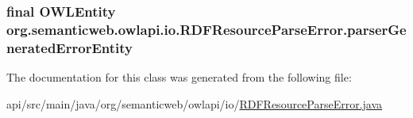 \hypertarget{classorg_1_1semanticweb_1_1owlapi_1_1io_1_1_r_d_f_resource_parse_error_aa023431539ae6f94f2891d39069b9077}{
\subsubsection[{parser\-Generated\-Error\-Entity}]{\setlength{\rightskip}{0pt plus 5cm}final {\bf O\-W\-L\-Entity} org.\-semanticweb.\-owlapi.\-io.\-R\-D\-F\-Resource\-Parse\-Error.\-parser\-Generated\-Error\-Entity\hspace{0.3cm}{\ttfamily [private]}}}\label{classorg_1_1semanticweb_1_1owlapi_1_1io_1_1_r_d_f_resource_parse_error_aa023431539ae6f94f2891d39069b9077}


The documentation for this class was generated from the following file\-:\begin{DoxyCompactItemize}
\item 
api/src/main/java/org/semanticweb/owlapi/io/\hyperlink{_r_d_f_resource_parse_error_8java}{R\-D\-F\-Resource\-Parse\-Error.\-java}\end{DoxyCompactItemize}
